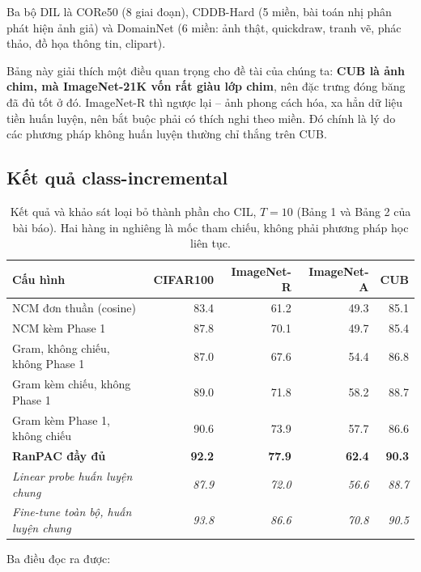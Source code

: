 \documentclass[11pt,a4paper]{article}
\newenvironment{luuy}{\begin{leftbar}\noindent\ignorespaces}{\end{leftbar}}
\begin{document}
Ba bộ DIL là CORe50 (8 giai đoạn), CDDB-Hard (5 miền, bài toán nhị phân phát hiện
ảnh giả) và DomainNet (6 miền: ảnh thật, quickdraw, tranh vẽ, phác thảo, đồ họa
thông tin, clipart).

\begin{luuy}
Bảng này giải thích một điều quan trọng cho đề tài của chúng ta: \textbf{CUB là
ảnh chim, mà ImageNet-21K vốn rất giàu lớp chim}, nên đặc trưng đóng băng đã đủ
tốt ở đó. ImageNet-R thì ngược lại -- ảnh phong cách hóa, xa hẳn dữ liệu tiền
huấn luyện, nên bắt buộc phải có thích nghi theo miền. Đó chính là lý do các
phương pháp không huấn luyện thường chỉ thắng trên CUB.
\end{luuy}

\subsection{Kết quả class-incremental}

\begin{table}[htbp]
\centering
\caption{Kết quả và khảo sát loại bỏ thành phần cho CIL, $T = 10$ (Bảng 1 và
Bảng 2 của bài báo). Hai hàng in nghiêng là mốc tham chiếu, không phải phương
pháp học liên tục.}
\label{tab:ketqua}
\begin{tabular}{lrrrr}
\toprule
Cấu hình & CIFAR100 & ImageNet-R & ImageNet-A & CUB \\
\midrule
NCM đơn thuần (cosine)              & 83.4 & 61.2 & 49.3 & 85.1 \\
NCM kèm Phase 1                     & 87.8 & 70.1 & 49.7 & 85.4 \\
Gram, không chiếu, không Phase 1    & 87.0 & 67.6 & 54.4 & 86.8 \\
Gram kèm chiếu, không Phase 1       & 89.0 & 71.8 & 58.2 & 88.7 \\
Gram kèm Phase 1, không chiếu       & 90.6 & 73.9 & 57.7 & 86.6 \\
\midrule
\textbf{RanPAC đầy đủ}              & \textbf{92.2} & \textbf{77.9} & \textbf{62.4} & \textbf{90.3} \\
\midrule
\emph{Linear probe huấn luyện chung}       & \emph{87.9} & \emph{72.0} & \emph{56.6} & \emph{88.7} \\
\emph{Fine-tune toàn bộ, huấn luyện chung} & \emph{93.8} & \emph{86.6} & \emph{70.8} & \emph{90.5} \\
\bottomrule
\end{tabular}
\end{table}

Ba điều đọc ra được:
\end{document}
